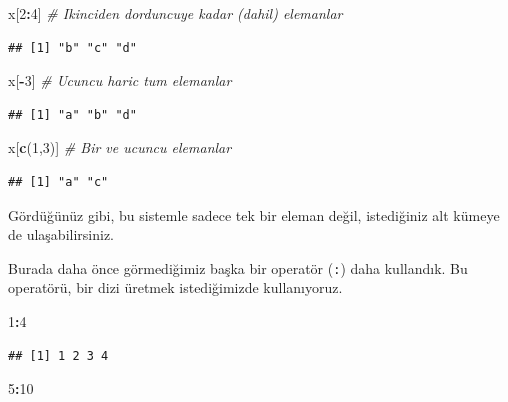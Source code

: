 \documentclass[]{book}
\newenvironment{Shaded}{\begin{snugshade}}{\end{snugshade}}
\newcommand{\CommentTok}[1]{\textcolor[rgb]{0.56,0.35,0.01}{\textit{#1}}}
\newcommand{\DecValTok}[1]{\textcolor[rgb]{0.00,0.00,0.81}{#1}}
\newcommand{\KeywordTok}[1]{\textcolor[rgb]{0.13,0.29,0.53}{\textbf{#1}}}
\newcommand{\NormalTok}[1]{#1}
\newcommand{\OperatorTok}[1]{\textcolor[rgb]{0.81,0.36,0.00}{\textbf{#1}}}
\begin{document}
\begin{Shaded}
\begin{Highlighting}[]
\NormalTok{x[}\DecValTok{2}\OperatorTok{:}\DecValTok{4}\NormalTok{] }\CommentTok{# Ikinciden dorduncuye kadar (dahil) elemanlar}
\end{Highlighting}
\end{Shaded}

\begin{verbatim}
## [1] "b" "c" "d"
\end{verbatim}

\begin{Shaded}
\begin{Highlighting}[]
\NormalTok{x[}\OperatorTok{-}\DecValTok{3}\NormalTok{] }\CommentTok{# Ucuncu haric tum elemanlar}
\end{Highlighting}
\end{Shaded}

\begin{verbatim}
## [1] "a" "b" "d"
\end{verbatim}

\begin{Shaded}
\begin{Highlighting}[]
\NormalTok{x[}\KeywordTok{c}\NormalTok{(}\DecValTok{1}\NormalTok{,}\DecValTok{3}\NormalTok{)] }\CommentTok{# Bir ve ucuncu elemanlar}
\end{Highlighting}
\end{Shaded}

\begin{verbatim}
## [1] "a" "c"
\end{verbatim}

Gördüğünüz gibi, bu sistemle sadece tek bir eleman değil, istediğiniz
alt kümeye de ulaşabilirsiniz.

Burada daha önce görmediğimiz başka bir operatör (\texttt{:}) daha
kullandık. Bu operatörü, bir dizi üretmek istediğimizde kullanıyoruz.

\begin{Shaded}
\begin{Highlighting}[]
\DecValTok{1}\OperatorTok{:}\DecValTok{4}
\end{Highlighting}
\end{Shaded}

\begin{verbatim}
## [1] 1 2 3 4
\end{verbatim}

\begin{Shaded}
\begin{Highlighting}[]
\DecValTok{5}\OperatorTok{:}\DecValTok{10}
\end{Highlighting}
\end{Shaded}
\end{document}

